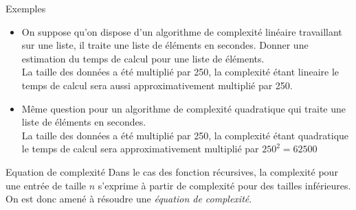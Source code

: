 \documentclass[10pt]{beamer}
\begin{document}
\begin{frame}[fragile]{\Ctitle}{\stitle}
	\begin{exampleblock}{Exemples}
		\begin{itemize}
			\item<1-> On suppose qu'on dispose d'un algorithme de complexité linéaire travaillant sur une liste, il traite une liste de  éléments en  secondes. Donner une estimation du temps de calcul pour une liste de  éléments.\\
				\onslide<2-> {\textcolor{OliveGreen}{La taille des données a été multiplié par 250, la complexité étant lineaire le temps de calcul sera aussi approximativement multiplié par 250. \\}}
				\onslide<3->{\textcolor{OliveGreen}{$0.015 \times 250 = 3.75$, on peut donc prévoir un temps de calcul d'environ 3,75 secondes}}
			\item<4-> Même question pour un algorithme de complexité quadratique qui traite une liste de  éléments en  secondes.\\
				\onslide<5-> {\textcolor{OliveGreen}{La taille des données a été multiplié par 250, la complexité étant quadratique le temps de calcul sera  approximativement multiplié par $250^2=62500$ \\}}
				\onslide<6->{\textcolor{OliveGreen}{$0.07 \times 62\,500 = 4375$, on peut donc prévoir un temps de calcul d'environ $4\,375$ secondes, c'est-à-dire près d'une heure et 15 minutes !}}
		\end{itemize}
	\end{exampleblock}
\end{frame}

\begin{frame}[fragile]{\Ctitle}{\stitle}
    \begin{block}{Equation de complexité}
        Dans le cas des fonction récursives, la complexité pour une entrée de taille $n$ s'exprime à partir de complexité pour des tailles inférieures. On est donc amené à résoudre une \textit{équation de complexité}.
    \end{block}
\end{frame}
\end{document}
